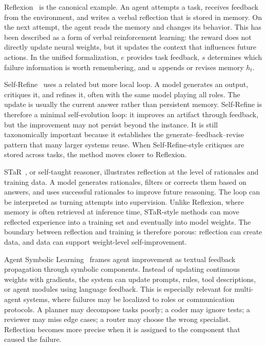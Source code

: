 Reflexion~\cite{reflexion2023} is the canonical example.  An agent attempts a task, receives feedback from the environment, and writes a verbal reflection that is stored in memory.  On the next attempt, the agent reads the memory and changes its behavior.  This has been described as a form of verbal reinforcement learning: the reward does not directly update neural weights, but it updates the context that influences future actions.  In the unified formalization, $e$ provides task feedback, $s$ determines which failure information is worth remembering, and $u$ appends or revises memory $h_t$.

Self-Refine~\cite{selfrefine2023} uses a related but more local loop.  A model generates an output, critiques it, and refines it, often with the same model playing all roles.  The update is usually the current answer rather than persistent memory.  Self-Refine is therefore a minimal self-evolution loop: it improves an artifact through feedback, but the improvement may not persist beyond the instance.  It is still taxonomically important because it establishes the generate--feedback--revise pattern that many larger systems reuse.  When Self-Refine-style critiques are stored across tasks, the method moves closer to Reflexion.

STaR~\cite{star2022}, or self-taught reasoner, illustrates reflection at the level of rationales and training data.  A model generates rationales, filters or corrects them based on answers, and uses successful rationales to improve future reasoning.  The loop can be interpreted as turning attempts into supervision.  Unlike Reflexion, where memory is often retrieved at inference time, STaR-style methods can move reflected experience into a training set and eventually into model weights.  The boundary between reflection and training is therefore porous: reflection can create data, and data can support weight-level self-improvement.

Agent Symbolic Learning~\cite{agentsymboliclearning2024} frames agent improvement as textual feedback propagation through symbolic components.  Instead of updating continuous weights with gradients, the system can update prompts, rules, tool descriptions, or agent modules using language feedback.  This is especially relevant for multi-agent systems, where failures may be localized to roles or communication protocols.  A planner may decompose tasks poorly; a coder may ignore tests; a reviewer may miss edge cases; a router may choose the wrong specialist.  Reflection becomes more precise when it is assigned to the component that caused the failure.

